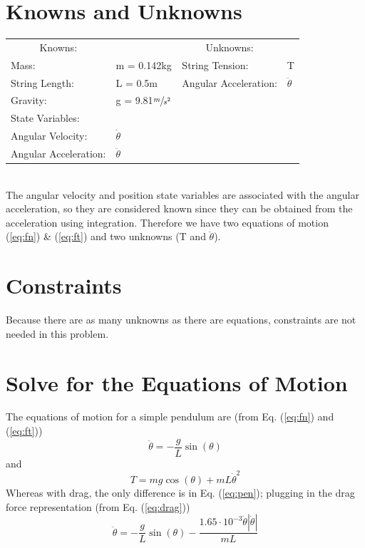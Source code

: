\documentclass[12pt]{report}
\begin{document}
\begin{flushleft}
\section{Knowns and Unknowns} \label{knownsandunknowns}
\begin{tabular}{ll@{\hskip .75in}ll}
  \multicolumn{1}{c}{Knowns:} && \multicolumn{1}{c}{Unknowns:} \\
  Mass: &m = 0.142kg & String Tension: & T \\
  String Length: &L = 0.5m & Angular Acceleration: & $\ddot{\theta}$ \\
  Gravity: &g = 9.81$\sfrac{m}{s^2}$ \\
  State Variables: \\
  \quad Angular Velocity: &$\dot{\theta}$ & \\
  \quad Angular Acceleration:&$\ddot{\theta}$ & \\
\end{tabular}
\vspace{2ex}
\\
The angular velocity and position state variables are associated with the angular
acceleration, so they are considered known since they can be obtained from the
acceleration using integration. Therefore we have two equations of motion
(\ref{eq:fn}) \& (\ref{eq:ft}) and two unknowns (T and $\ddot{\theta}$).
\section{Constraints}
Because there are as many unknowns as there are equations, constraints are not needed
in this problem. \\
\section{Solve for the Equations of Motion}
The equations of motion for a simple pendulum are
 (from Eq. (\ref{eq:fn}) and (\ref{eq:ft}))
\begin{equation} \label{eq:pen}
\ddot{\theta} = -\frac{g}{L}\sin(\theta)
\end{equation}
\center and
\begin{equation} \label{eq:T}
T = mg\cos(\theta) + mL\dot{\theta}^2
\end{equation}
Whereas with drag, the only difference is in Eq. (\ref{eq:pen}); plugging in
the drag force representation (from Eq. (\ref{eq:drag}))
\begin{equation}\label{eq:drageom}
  \ddot{\theta} = -\frac{g}{L}\sin(\theta) - \frac{1.65 \cdot 10^{-3}\dot{\theta}|\dot{\theta}|}{mL}
\end{equation}

\end{flushleft}
\end{document}
